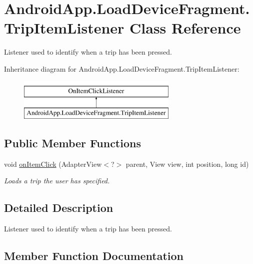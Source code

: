 \hypertarget{class_android_app_1_1_load_device_fragment_1_1_trip_item_listener}{}\section{Android\+App.\+Load\+Device\+Fragment.\+Trip\+Item\+Listener Class Reference}
\label{class_android_app_1_1_load_device_fragment_1_1_trip_item_listener}


Listener used to identify when a trip has been pressed.  


Inheritance diagram for Android\+App.\+Load\+Device\+Fragment.\+Trip\+Item\+Listener\+:\begin{figure}[H]
\begin{center}
\leavevmode
\includegraphics[height=2.000000cm]{class_android_app_1_1_load_device_fragment_1_1_trip_item_listener}
\end{center}
\end{figure}
\subsection*{Public Member Functions}
\begin{DoxyCompactItemize}
\item 
void \hyperlink{class_android_app_1_1_load_device_fragment_1_1_trip_item_listener_aa1eb00603eba3dbff13f1fa15bb9b958}{on\+Item\+Click} (Adapter\+View$<$?$>$ parent, View view, int position, long id)
\begin{DoxyCompactList}\small\item\em Loads a trip the user has specified. \end{DoxyCompactList}\end{DoxyCompactItemize}


\subsection{Detailed Description}
Listener used to identify when a trip has been pressed. 

\subsection{Member Function Documentation}
\mbox{\label{class_android_app_1_1_load_device_fragment_1_1_trip_item_listener_aa1eb00603eba3dbff13f1fa15bb9b958}} 
